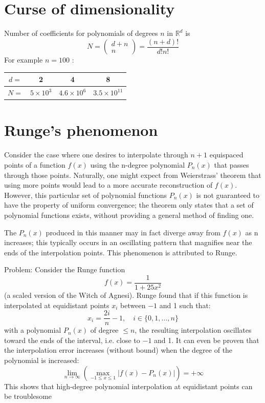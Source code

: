 \documentclass[10pt]{article}
\begin{document}
\section{Curse of dimensionality}
Number of coefficients for polynomials of degrees $n$ in $\mathbb{R}^{d}$ is
$$
N=\left(\begin{array}{c}
d+n \\
n
\end{array}\right)=\frac{(n+d) !}{d ! n !}
$$
For example $n=100$ :

\begin{tabular}{|c|c|c|c|}
\hline
$d=$ & 2 & 4 & 8 \\
\hline
$N=$ & $5 \times 10^{3}$ & $4.6 \times 10^{6}$ & $3.5 \times 10^{11}$ \\
\hline
\end{tabular}

\section{Runge's phenomenon}
Consider the case where one desires to interpolate through $n+1$ equispaced points of a function $f(x)$ using the n-degree polynomial $P_{n}(x)$ that passes through those points. Naturally, one might expect from Weierstrass' theorem that using more points would lead to a more accurate reconstruction of $f(x)$. However, this particular set of polynomial functions $P_{n}(x)$ is not guaranteed to have the property of uniform convergence; the theorem only states that a set of polynomial functions exists, without providing a general method of finding one.

The $P_{n}(x)$ produced in this manner may in fact diverge away from $f(x)$ as $\mathrm{n}$ increases; this typically occurs in an oscillating pattern that magnifies near the ends of the interpolation points. This phenomenon is attributed to Runge.

Problem: Consider the Runge function
$$
f(x)=\frac{1}{1+25 x^{2}}
$$
(a scaled version of the Witch of Agnesi). Runge found that if this function is interpolated at equidistant points $x_{i}$ between $-1$ and 1 such that:
$$
x_{i}=\frac{2 i}{n}-1, \quad i \in\{0,1, \ldots, n\}
$$
with a polynomial $P_{n}(x)$ of degree $\leq n$, the resulting interpolation oscillates toward the ends of the interval, i.e. close to $-1$ and 1. It can even be proven that the interpolation error increases (without bound) when the degree of the polynomial is increased:
$$
\lim _{n \rightarrow \infty}\left(\max _{-1 \leq x \leq 1}\left|f(x)-P_{n}(x)\right|\right)=+\infty
$$
This shows that high-degree polynomial interpolation at equidistant points can be troublesome
\end{document}
